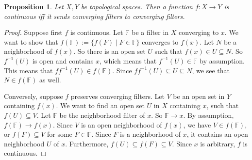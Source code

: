 \documentclass[12pt]{article}
\newtheorem{prop}{Proposition}
\begin{document}
\begin{prop} Let $X,Y$ be topological spaces.  Then a function $f:X\to Y$ is continuous iff it sends converging filters to converging filters. \end{prop}

\begin{proof}  Suppose first $f$ is continuous.  Let $\mathbb{F}$ be a filter in $X$ converging to $x$.  We want to show that $f(\mathbb{F}):=\lbrace f(F)\mid F\in \mathbb{F}\rbrace$ converges to $f(x)$.  Let $N$ be a neighborhood of $f(x)$.  So there is an open set $U$ such that $f(x)\in U\subseteq N$.  So $f^{-1}(U)$ is open and contains $x$, which means that $f^{-1}(U)\in \mathbb{F}$ by assumption.  This means that $ff^{-1}(U)\in f(\mathbb{F})$.  Since $ff^{-1}(U)\subseteq U \subseteq N$, we see that $N\in f(\mathbb{F})$ as well.

Conversely, suppose $f$ preserves converging filters.  Let $V$ be an open set in $Y$ containing $f(x)$.  We want to find an open set $U$ in $X$ containing $x$, such that $f(U)\subseteq V$.  Let $\mathbb{F}$ be the neighborhood filter of $x$.  So $\mathbb{F}\to x$.  By assumption, $f(\mathbb{F}) \to f(x)$.  Since $V$ is an open neighborhood of $f(x)$, we have $V\in f(\mathbb{F})$, or $f(F)\subseteq V$ for some $F\in \mathbb{F}$.  Since $F$ is a neighborhood of $x$, it contains an open neighborhood $U$ of $x$.  Furthermore, $f(U) \subseteq f(F) \subseteq V$.  Since $x$ is arbitrary, $f$ is continuous.
\end{proof}
\end{document}
